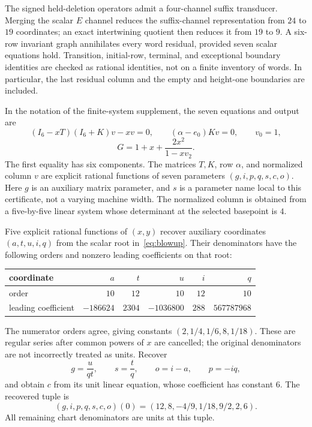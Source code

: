 \documentclass[11pt]{article}
\theoremstyle{definition}\newtheorem{definition}[theorem]{Definition}
\theoremstyle{remark}\newtheorem{remark}[theorem]{Remark}
\begin{document}
The signed held-deletion operators admit a four-channel suffix transducer. Merging the scalar $E$ channel reduces the suffix-channel representation from $24$ to $19$ coordinates; an exact intertwining quotient then reduces it from $19$ to $9$. A six-row invariant graph annihilates every word residual, provided seven scalar equations hold. Transition, initial-row, terminal, and exceptional boundary identities are checked as rational identities, not on a finite inventory of words. In particular, the last residual column and the empty and height-one boundaries are included.

In the notation of the finite-system supplement, the seven equations and output are
\begin{equation}\label{eq:seven}
 (I_6-xT)(I_6+K)v-xv=0,\qquad
 (\alpha-e_0)Kv=0,\qquad v_0=1,
\end{equation}
\begin{equation}\label{eq:output}
 G=1+x+\frac{2x^2}{1-xv_2}.
\end{equation}
The first equality has six components. The matrices $T,K$, row $\alpha$, and normalized column $v$ are explicit rational functions of seven parameters $(g,i,p,q,s,c,o)$. Here $g$ is an auxiliary matrix parameter, and $s$ is a parameter name local to this certificate, not a varying machine width. The normalized column is obtained from a five-by-five linear system whose determinant at the selected basepoint is $4$.

Five explicit rational functions of $(x,y)$ recover auxiliary coordinates $(a,t,u,i,q)$ from the scalar root in~\eqref{eq:blowup}. Their denominators have the following orders and nonzero leading coefficients on that root:
\begin{center}
\begin{tabular}{lrrrrr}\toprule
coordinate & $a$ & $t$ & $u$ & $i$ & $q$\\\midrule
order & $10$ & $12$ & $10$ & $12$ & $10$\\
leading coefficient & $-186624$ & $2304$ & $-1036800$ & $288$ & $567787968$\\\bottomrule
\end{tabular}
\end{center}
The numerator orders agree, giving constants $(2,1/4,1/6,8,1/18)$. These are regular series after common powers of $x$ are cancelled; the original denominators are not incorrectly treated as units. Recover
\[
 g=\frac{u}{qt},\qquad s=\frac tq,\qquad o=i-a,\qquad p=-iq,
\]
and obtain $c$ from its unit linear equation, whose coefficient has constant $6$. The recovered tuple is
\[
 (g,i,p,q,s,c,o)(0)=(12,8,-4/9,1/18,9/2,2,6).
\]
All remaining chart denominators are units at this tuple.
\end{document}

